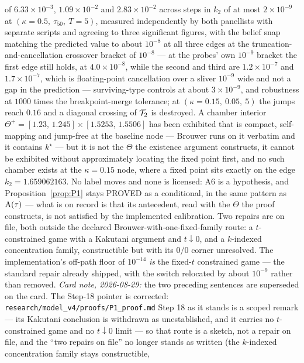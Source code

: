 \begin{remark}
of $6.33\times10^{-3}$, $1.09\times10^{-2}$ and $2.83\times10^{-2}$ across steps in $k_2$ of at most
$2\times10^{-9}$ at $(\kappa = 0.5,\ \tau_{50},\ T = 5)$, measured independently by both panellists
with separate scripts and agreeing to three significant figures, with the belief snap matching the
predicted value to about $10^{-8}$ at all three edges at the truncation-and-cancellation crossover
bracket of $10^{-8}$ --- at the probes' own $10^{-9}$ bracket the first edge still holds, at
$4.0\times10^{-8}$, while the second and third are $1.2\times10^{-7}$ and $1.7\times10^{-7}$, which
is floating-point cancellation over a sliver $10^{-9}$ wide and not a gap in the prediction ---
surviving-type controls at about $3\times10^{-9}$, and
robustness at $1000$ times the breakpoint-merge tolerance; at $(\kappa = 0.15,\ 0.05,\ 5)$ the jumps
reach $0.16$ and a diagonal crossing of $\mathcal{T}_2$ is destroyed. A chamber interior
$\Theta^+ = [1.23,\,1.245]\times[1.5253,\,1.5506]$ has been exhibited that is compact,
self-mapping and jump-free at the baseline node --- Brouwer runs on it verbatim and it contains
$k^\star$ --- but it is not the $\Theta$ the existence argument constructs, it cannot be exhibited
without approximately locating the fixed point first, and no such chamber exists at the
$\kappa = 0.15$ node, where a fixed point sits exactly on the edge $k_2 = 1.659062163$. No label
moves and none is licensed: A6 is a hypothesis, and Proposition~\ref{prop:P1} stays PROVED
as a conditional, in the same pattern as $\mathrm{A}(\tau)$ --- what is on record is that its antecedent, read
with the $\Theta$ the proof constructs, is not satisfied by the implemented calibration. Two repairs
are on file, both outside the declared Brouwer-with-one-fixed-family route: a $t$-constrained game
with a Kakutani argument and $t \downarrow 0$, and a $k$-indexed concentration family, constructible
but with its $0/0$ corner unresolved. The implementation's off-path floor of $10^{-14}$ \emph{is} the
fixed-$t$ constrained game --- the standard repair already shipped, with the switch relocated by
about $10^{-9}$ rather than removed. \emph{Card note, 2026-08-29:} the two preceding sentences are
superseded on the card. The Step-18 pointer is corrected:
\texttt{research/model\_v4/proofs/P1\_proof.md} Step 18 as it stands is a scoped remark --- its
Kakutani conclusion is withdrawn as unestablished, and it carries no $t$-constrained game and no
$t \downarrow 0$ limit --- so that route is a sketch, not a repair on file, and the ``two repairs
on file'' no longer stands as written (the $k$-indexed concentration family stays constructible,

\end{remark}
